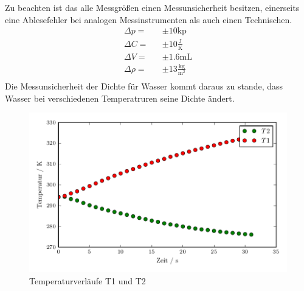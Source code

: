 Zu beachten ist das alle Messgrößen einen Messunsicherheit besitzen, einerseits eine Ablesefehler bei analogen Messinstrumenten als auch einen Technischen.
\begin{eqnarray*}
  \Delta p =& &\pm 10 \text{kp}				\\
  \Delta C =& &\pm 10 \frac{\text{J}}{\text{K}}		\\
  \Delta V =& &\pm 1.6 \text{mL}				\\
  \Delta \rho =& &\pm 13 \frac{\text{kg}}{\text{m$^2$}}	\\
\end{eqnarray*}
Die Messunsicherheit der Dichte für Wasser kommt daraus zu stande, dass Wasser bei verschiedenen Temperatruren seine Dichte ändert.
\begin{figure}
  \centering
  \includegraphics[width=\textwidth]{TVerlauf.pdf}
  \caption{Temperaturverläufe T1 und T2}
  \label{fig:T1&T2}
\end{figure}
